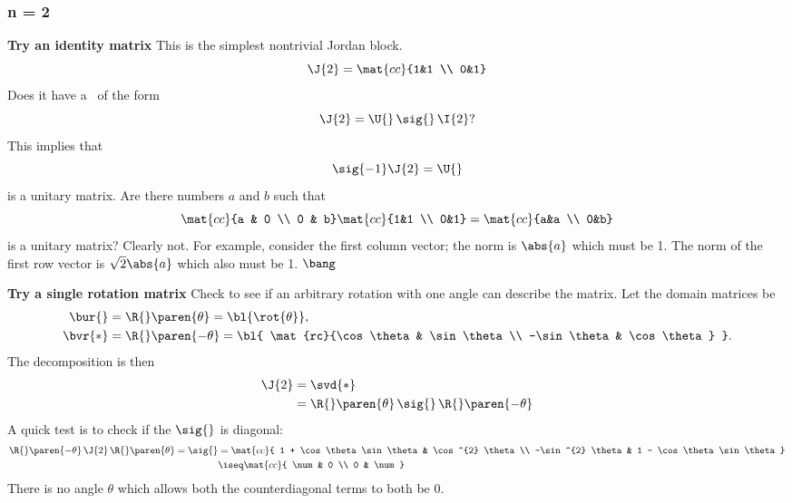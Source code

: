\subsubsection{n = 2}
\textbf{Try an identity matrix}
This is the simplest nontrivial Jordan block.
\begin{equation}
  \J{2} = \mat{cc}{1&1 \\ 0&1}
\end{equation}
Does it have a \asvd \ of the form
\begin{equation}
  \J{2} = \U{} \, \sig{} \, \I{2}?
\end{equation}
This implies that
\begin{equation}
  \sig{-1} \J{2} = \U{} 
\end{equation}
is a unitary matrix. Are there numbers $a$ and $b$ such that
\begin{equation}
  \mat{cc}{a & 0 \\ 0 & b} \mat{cc}{1&1 \\ 0&1} = \mat{cc}{a&a \\ 0&b}
\end{equation}
is a unitary matrix? Clearly not. For example, consider the first column vector; the norm is $\abs{a}$ which must be 1. The norm of the first row vector is $\sqrt{2}\abs{a}$ which also must be 1. $\bang$

\textbf{Try a single rotation matrix}
Check to see if an arbitrary rotation with one angle can describe the matrix. Let the domain matrices be
\begin{equation}
  \begin{split}
    \bur{}  &= \R{}\paren{\theta}  = {\bl{ \rot{\theta} }}, \\
    \bvr{*} &= \R{}\paren{-\theta} = {\bl{ \mat{rc}{\cos \theta & \sin \theta \\ -\sin \theta & \cos \theta} }}.
  \end{split}
\end{equation}
The decomposition is then
\begin{equation}
  \begin{split}
    \J{2} 
      &= \svd{*} \\
      &= \R{} \paren{\theta}\,
         \sig{} \,
         \R{} \paren{-\theta}
  \end{split}
\end{equation}
A quick test is to check if the $\sig{}$ is diagonal:
%
\begin{equation}
  \begin{split}
    \R{} \paren{-\theta}\, \J{2}\, \R{} \paren{\theta} = \sig{} 
      &= 
    \mat{cc}{ 1 + \cos \theta \sin \theta & \cos^{2} \theta \\
             -\sin^{2} \theta & 1 - \cos \theta \sin \theta } \\
      &\iseq \mat{cc}{ \num & 0 \\ 0 & \num }
  \end{split}
\end{equation}
There is no angle $\theta$ which allows both the counterdiagonal terms to both be 0.

